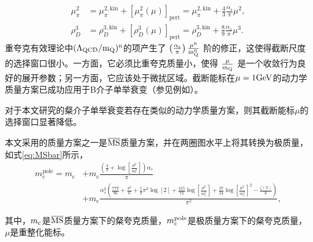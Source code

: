     \begin{equation}
        \begin{aligned}
        \mu_\pi^2 & =\mu_\pi^{2, \mathrm{kin}}+\left[\mu_\pi^2(\mu)\right]_{\mathrm{pert}}=\mu_\pi^{2, \mathrm{kin}}+\frac{4}{3} \frac{\alpha_s}{\pi} \mu^2, \\
        \rho_D^3 & =\rho_D^{3, \mathrm{kin}}+\left[\rho_D^3(\mu)\right]_{\mathrm{pert}}=\rho_D^{3, \mathrm{kin}}+\frac{8}{9} \frac{\alpha_s}{\pi} \mu^3.
        \end{aligned}
        \end{equation}
        重夸克有效理论中$\mathrm{(\Lambda_{QCD}/m_{Q})^{n}}$的项产生了 $\mathrm{\left(\frac{\alpha_s}{\pi}\right) \frac{\mu^n}{m_Q^n}}$ 阶的修正，这使得截断尺度的选择窗口很小。一方面，它必须比重夸克质量小，使得 $\frac{\mu}{m_{\mathrm{Q}}}$ 是一个收敛行为良好的展开参数；另一方面，它应该处于微扰区域。截断能标在$\mu= 1\mathrm{GeV}$的动力学质量方案已成功应用于B介子单举衰变（参见例如）。

        对于本文研究的粲介子单举衰变若存在类似的动力学质量方案，则其截断能标$\mu$的选择窗口显著降低。

        本文采用的质量方案之一是$\overline{\mathrm{MS}}$质量方案，并在两圈图水平上将其转换为极质量，如式\eqref{eq:MSbar}所示，
        \begin{equation}
            \begin{aligned}
                m_{\text{c}}^{\text{pole}} = m_{\text{c}} &+ m_{\text{c}}\frac{\left(\frac{4}{3} + \log \left[\frac{\mu^2}{m_{\text{c}}^2}\right]\right) \alpha_s}{\pi} \\
                &+m_{\text{c}} \frac{\alpha_s^2\left(\frac{779}{96} + \frac{\pi^2}{6} + \frac{1}{9} \pi^2 \log [2] + \frac{415}{72} \log \left[\frac{\mu^2}{m_{\text{c}}^2}\right] + \frac{37}{24} \log \left[\frac{\mu^2}{m_{\text{c}}^2}\right]^2 - \frac{\zeta(3)}{6}\right)}{\pi^2},
            \end{aligned}
                \label{eq:MSbar}
            \end{equation}

        其中，$m_{\mathrm{c}}$是$\mathrm{\overline{MS}}$质量方案下的粲夸克质量，$m_{\mathrm{c}}^{\text{pole}}$是极质量方案下的粲夸克质量，$\mu$是重整化能标。
        
